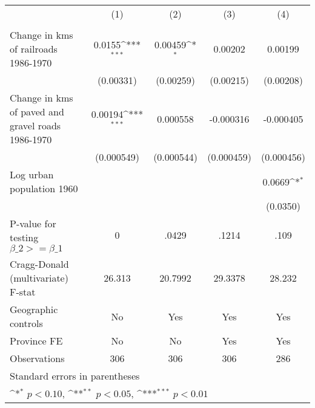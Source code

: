 {
\def\sym#1{\ifmmode^{#1}\else\(^{#1}\)\fi}
\begin{tabular}{l*{4}{c}}
\hline\hline
                &\multicolumn{1}{c}{(1)}&\multicolumn{1}{c}{(2)}&\multicolumn{1}{c}{(3)}&\multicolumn{1}{c}{(4)}\\
                &\multicolumn{1}{c}{}&\multicolumn{1}{c}{}&\multicolumn{1}{c}{}&\multicolumn{1}{c}{}\\
\hline
Change in kms of railroads 1986-1970&   0.0155\sym{***}&  0.00459\sym{*}  &  0.00202         &  0.00199         \\
                &(0.00331)         &(0.00259)         &(0.00215)         &(0.00208)         \\
[1em]
Change in kms of paved and gravel roads 1986-1970&  0.00194\sym{***}& 0.000558         &-0.000316         &-0.000405         \\
                &(0.000549)         &(0.000544)         &(0.000459)         &(0.000456)         \\
[1em]
Log urban population 1960&                  &                  &                  &   0.0669\sym{*}  \\
                &                  &                  &                  & (0.0350)         \\
\hline
P-value for testing $\beta\_{2} >= \beta\_{1}$&        0         &    .0429         &    .1214         &     .109         \\
Cragg-Donald (multivariate) F-stat&   26.313         &  20.7992         &  29.3378         &   28.232         \\
Geographic controls&       No         &      Yes         &      Yes         &      Yes         \\
Province FE     &       No         &       No         &      Yes         &      Yes         \\
Observations    &      306         &      306         &      306         &      286         \\
\hline\hline
\multicolumn{5}{l}{\footnotesize Standard errors in parentheses}\\
\multicolumn{5}{l}{\footnotesize \sym{*} \(p<0.10\), \sym{**} \(p<0.05\), \sym{***} \(p<0.01\)}\\
\end{tabular}
}
